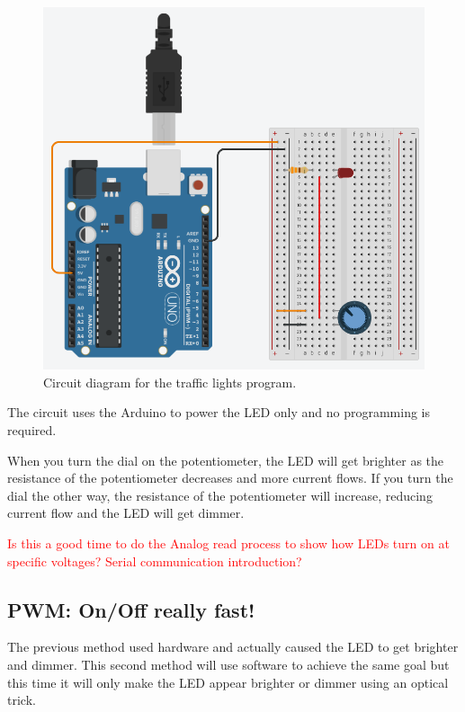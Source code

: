 \documentclass[12pt]{article}
\begin{document}
	\begin{figure}[H]
	\begin{center}
		\includegraphics[scale=0.5]{LED_brightness_pot}
		\caption{Circuit diagram for the traffic lights program.}
		\label{fig:circuit_pot_brightness_ctrl}
	\end{center}
	\end{figure}

	The circuit uses the Arduino to power the LED only and no programming is required.
	
	When you turn the dial on the potentiometer, the LED will get brighter as the resistance of the potentiometer decreases and more current flows. If you turn the dial the other way, the resistance of the potentiometer will increase, reducing current flow and the LED will get dimmer.
	
	
	\textcolor{red}{Is this a good time to do the Analog read process to show how LEDs turn on at specific voltages? Serial communication introduction?}
	
	
	
	\subsection{PWM: On/Off really fast!}
	\label{ssec:PWM intro}
	
	The previous method used hardware and actually caused the LED to get brighter and dimmer. This second method will use software to achieve the same goal but this time it will only make the LED appear brighter or dimmer using an optical trick.
	
\end{document}
